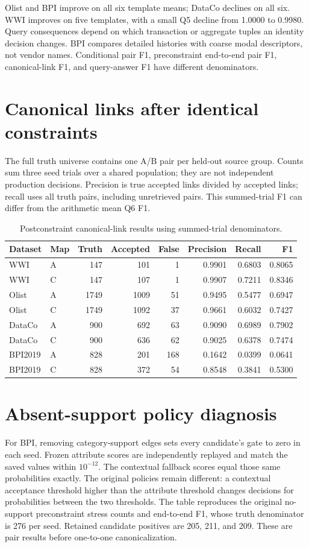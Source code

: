 \documentclass[11pt,letterpaper]{article}
\begin{document}
Olist and BPI improve on all six template means; DataCo declines on all six. WWI improves on five templates, with a small Q5 decline from 1.0000 to 0.9980. Query consequences depend on which transaction or aggregate tuples an identity decision changes. BPI compares detailed histories with coarse modal descriptors, not vendor names. Conditional pair F1, preconstraint end-to-end pair F1, canonical-link F1, and query-answer F1 have different denominators.

\section{Canonical links after identical constraints}
The full truth universe contains one A/B pair per held-out source group. Counts sum three seed trials over a shared population; they are not independent production decisions. Precision is true accepted links divided by accepted links; recall uses all truth pairs, including unretrieved pairs. This summed-trial F1 can differ from the arithmetic mean Q6 F1.


\begin{table}[htbp]\centering\small\caption{Postconstraint canonical-link results using summed-trial denominators.}
\begin{tabular}{llrrrrrr}
\toprule Dataset & Map & Truth & Accepted & False & Precision & Recall & F1\\\midrule
WWI & A & 147 & 101 & 1 & 0.9901 & 0.6803 & 0.8065\\
WWI & C & 147 & 107 & 1 & 0.9907 & 0.7211 & 0.8346\\
Olist & A & 1749 & 1009 & 51 & 0.9495 & 0.5477 & 0.6947\\
Olist & C & 1749 & 1092 & 37 & 0.9661 & 0.6032 & 0.7427\\
DataCo & A & 900 & 692 & 63 & 0.9090 & 0.6989 & 0.7902\\
DataCo & C & 900 & 636 & 62 & 0.9025 & 0.6378 & 0.7474\\
BPI2019 & A & 828 & 201 & 168 & 0.1642 & 0.0399 & 0.0641\\
BPI2019 & C & 828 & 372 & 54 & 0.8548 & 0.3841 & 0.5300\\
\bottomrule\end{tabular}\end{table}


\section{Absent-support policy diagnosis}
For BPI, removing category-support edges sets every candidate's gate to zero in each seed. Frozen attribute scores are independently replayed and match the saved values within $10^{-12}$. The contextual fallback scores equal those same probabilities exactly. The original policies remain different: a contextual acceptance threshold higher than the attribute threshold changes decisions for probabilities between the two thresholds. The table reproduces the original no-support preconstraint stress counts and end-to-end F1, whose truth denominator is 276 per seed. Retained candidate positives are 205, 211, and 209. These are pair results before one-to-one canonicalization.
\end{document}
